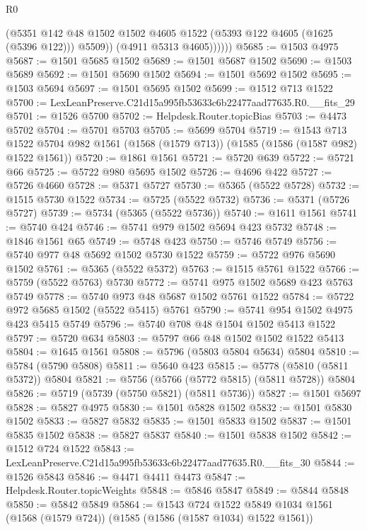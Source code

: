 \begin{lexlean}{R0}
\begin{coremodule}
                (@5351
                  @142
                  @48
                  @1502
                  @1502
                  @4605
                  @1522
                  (@5393 @122 @4605 (@1625 (@5396 @122)))
                  @5509))
              (@4911 @5313 @4605))))))
@5685 := @1503 @4975
@5687 := @1501 @5685 @1502
@5689 := @1501 @5687 @1502
@5690 := @1503 @5689
@5692 := @1501 @5690 @1502
@5694 := @1501 @5692 @1502
@5695 := @1503 @5694
@5697 := @1501 @5695 @1502
@5699 := @1512 @713 @1522
@5700 := LexLeanPreserve.C21d15a995fb53633c6b22477aad77635.R0.__fits_29
@5701 := @1526 @5700
@5702 := Helpdesk.Router.topicBias
@5703 := @4473 @5702
@5704 := @5701 @5703
@5705 := @5699 @5704
@5719 := @1543
    @713
    @1522
    @5704
    @982
    @1561
    (@1568 (@1579 @713))
    (@1585 (@1586 (@1587 @982) @1522 @1561))
@5720 := @1861 @1561
@5721 := @5720 @639
@5722 := @5721 @66
@5725 := @5722 @980 @5695 @1502
@5726 := @4696 @422
@5727 := @5726 @4660
@5728 := @5371 @5727
@5730 := @5365 (@5522 @5728)
@5732 := @1515 @5730 @1522
@5734 := @5725 (@5522 @5732)
@5736 := @5371 (@5726 @5727)
@5739 := @5734 (@5365 (@5522 @5736))
@5740 := @1611 @1561
@5741 := @5740 @424
@5746 := @5741 @979 @1502 @5694 @423 @5732
@5748 := @1846 @1561 @65
@5749 := @5748 @423
@5750 := @5746 @5749
@5756 := @5740 @977 @48 @5692 @1502 @5730 @1522
@5759 := @5722 @976 @5690 @1502
@5761 := @5365 (@5522 @5372)
@5763 := @1515 @5761 @1522
@5766 := @5759 (@5522 @5763) @5730
@5772 := @5741 @975 @1502 @5689 @423 @5763 @5749
@5778 := @5740 @973 @48 @5687 @1502 @5761 @1522
@5784 := @5722 @972 @5685 @1502 (@5522 @5415) @5761
@5790 := @5741 @954 @1502 @4975 @423 @5415 @5749
@5796 := @5740 @708 @48 @1504 @1502 @5413 @1522
@5797 := @5720 @634
@5803 := @5797 @66 @48 @1502 @1502 @1522 @5413
@5804 := @1645 @1561
@5808 := @5796 (@5803 @5804 @5634) @5804
@5810 := @5784 (@5790 @5808)
@5811 := @5640 @423
@5815 := @5778 (@5810 (@5811 @5372)) @5804
@5821 := @5756 (@5766 (@5772 @5815) (@5811 @5728)) @5804
@5826 := @5719 (@5739 (@5750 @5821) (@5811 @5736))
@5827 := @1501 @5697
@5828 := @5827 @4975
@5830 := @1501 @5828 @1502
@5832 := @1501 @5830 @1502
@5833 := @5827 @5832
@5835 := @1501 @5833 @1502
@5837 := @1501 @5835 @1502
@5838 := @5827 @5837
@5840 := @1501 @5838 @1502
@5842 := @1512 @724 @1522
@5843 := LexLeanPreserve.C21d15a995fb53633c6b22477aad77635.R0.__fits_30
@5844 := @1526 @5843
@5846 := @4471 @4411 @4473
@5847 := Helpdesk.Router.topicWeights
@5848 := @5846 @5847
@5849 := @5844 @5848
@5850 := @5842 @5849
@5864 := @1543
    @724
    @1522
    @5849
    @1034
    @1561
    (@1568 (@1579 @724))
    (@1585 (@1586 (@1587 @1034) @1522 @1561))

\end{coremodule}
\end{lexlean}
